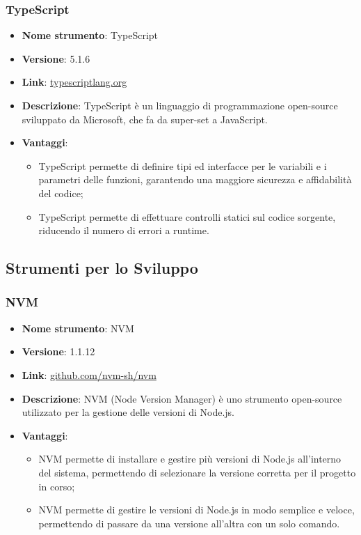 \subsubsection{TypeScript}
\begin{itemize}
      \item \textbf{Nome strumento}: TypeScript
      \item \textbf{Versione}: 5.1.6
      \item \textbf{Link}: \href{https://www.typescriptlang.org/}{typescriptlang.org}
      \item \textbf{Descrizione}: TypeScript è un linguaggio di programmazione open-source sviluppato da Microsoft, che fa da super-set a JavaScript.
      \item \textbf{Vantaggi}:
            \begin{itemize}
                  \item TypeScript permette di definire tipi ed interfacce per le variabili e i parametri delle funzioni, garantendo una maggiore sicurezza e affidabilità del codice;
                  \item TypeScript permette di effettuare controlli statici sul codice sorgente, riducendo il numero di errori a runtime.
            \end{itemize}
\end{itemize}

\subsection{Strumenti per lo Sviluppo}

\subsubsection{NVM}
\begin{itemize}
      \item \textbf{Nome strumento}: NVM
      \item \textbf{Versione}: 1.1.12
      \item \textbf{Link}: \href{https://github.com/nvm-sh/nvm}{github.com/nvm-sh/nvm}
      \item \textbf{Descrizione}: NVM (Node Version Manager) è uno strumento open-source utilizzato per la gestione delle versioni di Node.js.
      \item \textbf{Vantaggi}:
            \begin{itemize}
                  \item NVM permette di installare e gestire più versioni di Node.js all'interno del sistema, permettendo di selezionare la versione corretta
                        per il progetto in corso;
                  \item NVM permette di gestire le versioni di Node.js in modo semplice e veloce, permettendo di passare da una versione all'altra con un solo comando.
            \end{itemize}
\end{itemize}

